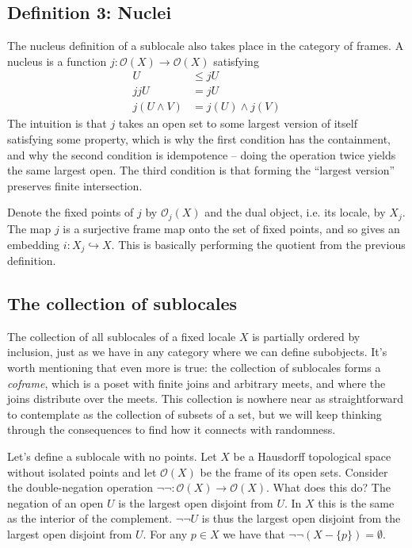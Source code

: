\documentclass[12pt]{extarticle}
\renewcommand{\o}{\ensuremath{\mathcal{O}}}
\begin{document}
\subsection{Definition 3: Nuclei}
The nucleus definition of a sublocale also takes place in the category of frames. A nucleus is a function $j:\o(X)\to\o(X)$ satisfying
\begin{align}
U&\leq jU \\
jjU &= jU \\
j(U\wedge V)&=j(U)\wedge j(V)
\end{align}
The intuition is that $j$ takes an open set to some largest version of itself satisfying some property, which is why the first condition has the containment, and why the second condition is idempotence -- doing the operation twice yields the same largest open. The third condition is that forming the ``largest version'' preserves finite intersection.

Denote the fixed points of $j$ by $\o_j(X)$ and the dual object, i.e. its locale, by $X_j$. The map $j$ is a surjective frame map onto the set of fixed points, and so gives an embedding $i:X_j\hookrightarrow X$. This is basically performing the quotient from the previous definition.

\subsection{The collection of sublocales}
The collection of all sublocales of a fixed locale $X$ is partially ordered by inclusion, just as we have in any category where we can define subobjects. It's worth mentioning that even more is true: the collection of sublocales forms a \emph{coframe}, which is a poset with finite joins and arbitrary meets, and where the joins distribute over the meets. This collection is nowhere near as straightforward to contemplate as the collection of subsets of a set, but we will keep thinking through the consequences to find how it connects with randomness.

Let's define a sublocale with no points. Let $X$ be a Hausdorff topological space without isolated points and let $\o(X)$ be the frame of its open sets. Consider the double-negation operation $\neg\neg:\o(X)\to\o(X)$. What does this do? The negation of an open $U$ is the largest open disjoint from $U$. In $X$ this is the same as the interior of the complement. $\neg\neg U$ is thus the largest open disjoint from the largest open disjoint from $U$. For any $p\in X$ we have that $\neg\neg(X-\{p\}) = \emptyset$. 
\end{document}

